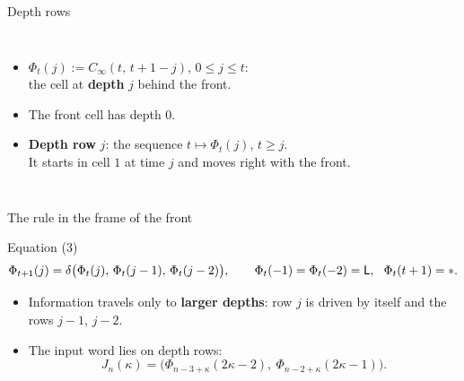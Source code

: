 \begin{frame}{Depth rows}
\begin{columns}[T]
\begin{itemize}
\item $\Phi_t(j):=C_\infty(t,\,t+1-j)$, $0\le j\le t$:\\ the cell at \textbf{depth} $j$ behind the front.
\item The front cell has depth $0$.
\item \textbf{Depth row} $j$: the sequence $t\mapsto\Phi_t(j)$, $t\ge j$.\\ It starts in cell $1$ at time $j$ and moves right with the front.
\end{itemize}
\end{columns}
\end{frame}

\begin{frame}{The rule in the frame of the front}
\begin{statement}{Equation (3)}
\[\Phi_{t+1}(j)=\delta\bigl(\Phi_t(j),\,\Phi_t(j-1),\,\Phi_t(j-2)\bigr),\qquad \Phi_t(-1)=\Phi_t(-2)=\mathsf L,\ \ \Phi_t(t+1)=\ast.\]
\end{statement}
\begin{itemize}
\item Information travels only to \textbf{larger depths}: row $j$ is driven by itself and the rows $j-1$, $j-2$.
\item The input word lies on depth rows:
\[J_n(\kappa)=\bigl(\Phi_{n-3+\kappa}(2\kappa-2),\ \Phi_{n-2+\kappa}(2\kappa-1)\bigr).\]
\end{itemize}
\end{frame}


